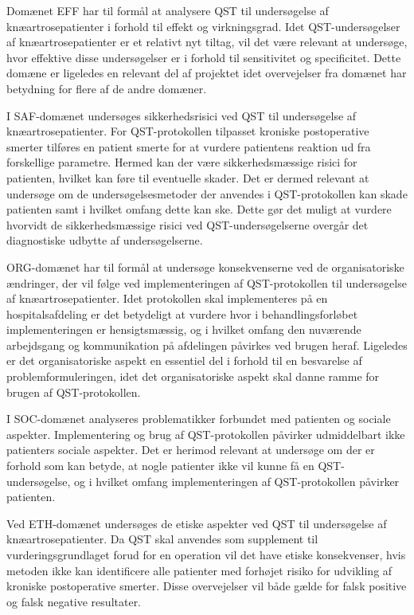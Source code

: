 Domænet EFF har til formål at analysere QST til undersøgelse af knæartrosepatienter i forhold til effekt og virkningsgrad. Idet QST-undersøgelser af knæartrosepatienter er et relativt nyt tiltag, vil det være relevant at undersøge, hvor effektive disse undersøgelser er i forhold til sensitivitet og specificitet. Dette domæne er ligeledes en relevant del af projektet idet overvejelser fra domænet har betydning for flere af de andre domæner.   

I SAF-domænet undersøges sikkerhedsrisici ved QST til undersøgelse af knæartrosepatienter. For QST-protokollen tilpasset kroniske postoperative smerter tilføres en patient smerte for at vurdere patientens reaktion ud fra forskellige parametre. Hermed kan der være sikkerhedsmæssige risici for patienten, hvilket kan føre til eventuelle skader. Det er dermed relevant at undersøge om de undersøgelsesmetoder der anvendes i QST-protokollen kan skade patienten samt i hvilket omfang dette kan ske. Dette gør det muligt at vurdere hvorvidt de sikkerhedsmæssige risici ved QST-undersøgelserne overgår det diagnostiske udbytte af undersøgelserne. 

ORG-domænet har til formål at undersøge konsekvenserne ved de organisatoriske ændringer, der vil følge ved implementeringen af QST-protokollen til undersøgelse af knæartrosepatienter. Idet protokollen skal implementeres på en hospitalsafdeling er det betydeligt at vurdere hvor i behandlingsforløbet implementeringen er hensigtsmæssig, og i hvilket omfang den nuværende arbejdsgang og kommunikation på afdelingen påvirkes ved brugen heraf. Ligeledes er det organisatoriske aspekt en essentiel del i forhold til en besvarelse af problemformuleringen, idet det organisatoriske aspekt skal danne ramme for brugen af QST-protokollen.

I SOC-domænet analyseres problematikker forbundet med patienten og sociale aspekter. Implementering og brug af QST-protokollen påvirker udmiddelbart ikke patienters sociale aspekter. Det er herimod relevant at undersøge om  der er forhold som kan betyde, at nogle patienter ikke vil kunne få en QST-undersøgelse, og i hvilket omfang implementeringen af QST-protokollen påvirker patienten.

Ved ETH-domænet undersøges de etiske aspekter ved QST til undersøgelse af knæartrosepatienter. Da QST skal anvendes som supplement til vurderingsgrundlaget forud for en operation vil det have etiske konsekvenser, hvis metoden ikke kan identificere alle patienter med forhøjet risiko for udvikling af kroniske postoperative smerter. Disse overvejelser vil både gælde for falsk positive og falsk negative resultater. 

